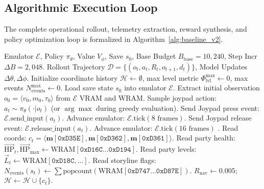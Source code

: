 \documentclass[conference]{IEEEtran}
\begin{document}
\subsection{Algorithmic Execution Loop}
The complete operational rollout, telemetry extraction, reward synthesis, and policy optimization loop is formalized in Algorithm~\ref{alg:baseline_v2}.

\begin{algorithm}[t]
\caption{Baseline V2 Joypad-Cadence Rollout and Composite Reward Execution Engine}
\label{alg:baseline_v2}
\footnotesize
\begin{algorithmic}[1]
\REQUIRE Emulator $\mathcal{E}$, Policy $\pi_\theta$, Value $V_\phi$, Save $s_0$, Base Budget $B_{\text{base}} = 10{,}240$, Step Incr $\Delta B = 2{,}048$.
\ENSURE Rollout Trajectory $\mathcal{D} = \{ (o_t, a_t, R_t, o_{t+1}, d_t) \}$, Model Updates $\Delta \theta, \Delta \phi$.
\STATE Initialize coordinate history $\mathcal{H} \leftarrow \emptyset$, max level metric $\Phi_{\text{lvl}}^{\max} \leftarrow 0$, max events $N_{\text{events}}^{\max} \leftarrow 0$.
\STATE Load save state $s_0$ into emulator $\mathcal{E}$.
\STATE Extract initial observation $o_0 = \langle v_0, m_0, \tau_0 \rangle$ from $\mathcal{E}$ VRAM and WRAM.
    \STATE Sample joypad action: $a_t \sim \pi_\theta(\cdot | o_t)$ (or $\arg\max$ during greedy evaluation).
    \STATE {}
    \STATE Send Joypad press event: $\mathcal{E}.\text{send\_input}(a_t)$.
    \STATE Advance emulator: $\mathcal{E}.\text{tick}(8\text{ frames})$.
    \STATE Send Joypad release event: $\mathcal{E}.\text{release\_input}(a_t)$.
    \STATE Advance emulator: $\mathcal{E}.\text{tick}(16\text{ frames})$ .
    \STATE {}
    \STATE Read coords: $c_t = \langle \mathbf{m}[\texttt{0xD35E}], \mathbf{m}[\texttt{0xD362}], \mathbf{m}[\texttt{0xD361}] \rangle$.
    \STATE Read party health: $\vec{\text{HP}}_t, \vec{\text{HP}}_{\max} \leftarrow \text{WRAM}[\texttt{0xD16C}\dots\texttt{0xD194}]$.
    \STATE Read party levels: $\vec{L}_t \leftarrow \text{WRAM}[\texttt{0xD18C}, \dots]$.
    \STATE Read storyline flags: $N_{\text{events}}(s_t) \leftarrow \sum \text{popcount}(\text{WRAM}[\texttt{0xD747}\dots\texttt{0xD87E}])$.
    \STATE {}
        \STATE $R_{\text{nav}} \leftarrow 0.005$; \quad $\mathcal{H} \leftarrow \mathcal{H} \cup \{ c_t \}$.

\end{algorithmic}
\end{algorithm}
\end{document}
